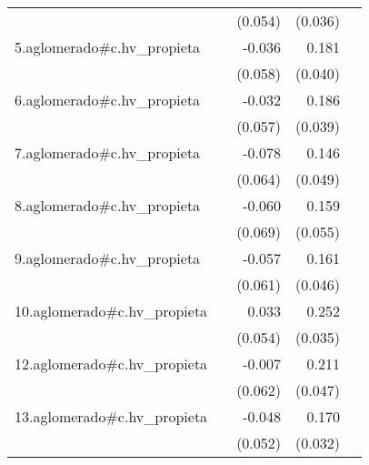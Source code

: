 {\begin{longtable}{l*{4}{D{.}{.}{-1}}}
            &                     &     (0.054)         &     (0.036)         &                     \\
\addlinespace
5.aglomerado#c.hv\_propieta&                     &      -0.036         &       0.181\sym{***}&                     \\
            &                     &     (0.058)         &     (0.040)         &                     \\
\addlinespace
6.aglomerado#c.hv\_propieta&                     &      -0.032         &       0.186\sym{***}&                     \\
            &                     &     (0.057)         &     (0.039)         &                     \\
\addlinespace
7.aglomerado#c.hv\_propieta&                     &      -0.078         &       0.146\sym{**} &                     \\
            &                     &     (0.064)         &     (0.049)         &                     \\
\addlinespace
8.aglomerado#c.hv\_propieta&                     &      -0.060         &       0.159\sym{**} &                     \\
            &                     &     (0.069)         &     (0.055)         &                     \\
\addlinespace
9.aglomerado#c.hv\_propieta&                     &      -0.057         &       0.161\sym{***}&                     \\
            &                     &     (0.061)         &     (0.046)         &                     \\
\addlinespace
10.aglomerado#c.hv\_propieta&                     &       0.033         &       0.252\sym{***}&                     \\
            &                     &     (0.054)         &     (0.035)         &                     \\
\addlinespace
12.aglomerado#c.hv\_propieta&                     &      -0.007         &       0.211\sym{***}&                     \\
            &                     &     (0.062)         &     (0.047)         &                     \\
\addlinespace
13.aglomerado#c.hv\_propieta&                     &      -0.048         &       0.170\sym{***}&                     \\
            &                     &     (0.052)         &     (0.032)         &                     \\

\end{longtable}}
